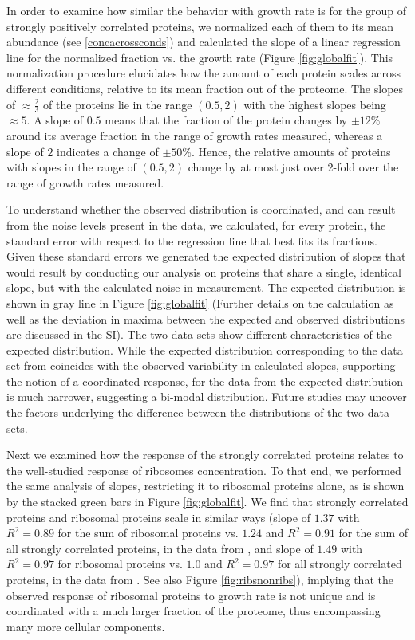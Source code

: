 \documentclass{article}
\newcommand{\hGlobalSumSlope}{$1.24$}
\newcommand{\hGlobalSumRsq}{0.91}
\newcommand{\hRibsSumSlope}{$1.37$}
\newcommand{\hRibsSumRsq}{0.89}
\newcommand{\vnGlobalSumSlope}{$1.0$}
\newcommand{\vGlobalSumSlope}{\vnGlobalSumSlope{}}
\newcommand{\vnGlobalSumRsq}{0.97}
\newcommand{\vGlobalSumRsq}{\vnGlobalSumRsq{}}
\newcommand{\vnRibsSumSlope}{$1.49$}
\newcommand{\vRibsSumSlope}{\vnRibsSumSlope{}}
\newcommand{\vnRibsSumRsq}{0.97}
\newcommand{\vRibsSumRsq}{\vnRibsSumRsq{}}
\begin{document}
In order to examine how similar the behavior with growth rate is for the group of strongly positively correlated proteins, we normalized each of them to its mean abundance (see \ref{concacrossconds}) and calculated the slope of a linear regression line for the normalized fraction vs. the growth rate (Figure \ref{fig:globalfit}).
This normalization procedure elucidates how the amount of each protein scales across different conditions, relative to its mean fraction out of the proteome.
The slopes of $\approx \frac{2}{3}$ of the proteins lie in the range $(0.5,2)$ with the highest slopes being $\approx 5$.
A slope of $0.5$ means that the fraction of the protein changes by $\pm12\%$ around its average fraction in the range of growth rates measured, whereas a slope of $2$ indicates a change of $\pm50\%$.
Hence, the relative amounts of proteins with slopes in the range of $(0.5,2)$ change by at most just over 2-fold over the range of growth rates measured.

To understand whether the observed distribution is coordinated, and can result from the noise levels present in the data, we calculated, for every protein, the standard error with respect to the regression line that best fits its fractions.
Given these standard errors we generated the expected distribution of slopes that would result by conducting our analysis on proteins that share a single, identical slope, but with the calculated noise in measurement.
The expected distribution is shown in gray line in Figure \ref{fig:globalfit} (Further details on the calculation as well as the deviation in maxima between the expected and observed distributions are discussed in the SI).
The two data sets show different characteristics of the expected distribution.
While the expected distribution corresponding to the data set from \cite{Schmidt2015} coincides with the observed variability in calculated slopes, supporting the notion of a coordinated response, for the data from \cite{Peebo_2015} the expected distribution is much narrower, suggesting a bi-modal distribution.
Future studies may uncover the factors underlying the difference between the distributions of the two data sets.

Next we examined how the response of the strongly correlated proteins relates to the well-studied response of ribosomes concentration.
To that end, we performed the same analysis of slopes, restricting it to ribosomal proteins alone, as is shown by the stacked green bars in Figure \ref{fig:globalfit}.
We find that strongly correlated proteins and ribosomal proteins scale in similar ways (slope of \hRibsSumSlope{} with $R^2=\hRibsSumRsq{}$ for the sum of ribosomal proteins vs. \hGlobalSumSlope{} and $R^2=\hGlobalSumRsq$ for the sum of all strongly correlated proteins, in the data from \cite{Schmidt2015}, and slope of \vRibsSumSlope{} with $R^2=\vRibsSumRsq{}$ for ribosomal proteins vs. \vGlobalSumSlope{} and $R^2=\vGlobalSumRsq{}$ for all strongly correlated proteins, in the data from \cite{Peebo_2015}. See also Figure \ref{fig:ribsnonribs}), implying that the observed response of ribosomal proteins to growth rate is not unique and is coordinated with a much larger fraction of the proteome, thus encompassing many more cellular components.
\end{document}
